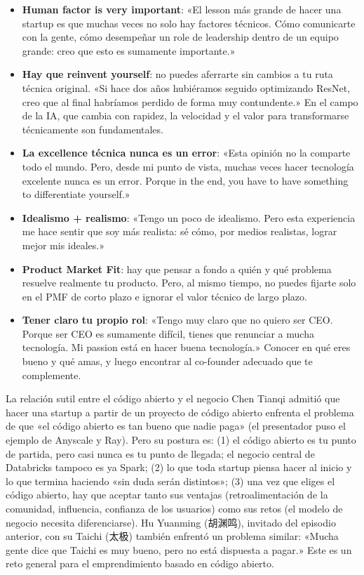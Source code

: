 \begin{itemize}
    \item \textbf{Human factor is very important}: «El lesson más grande de hacer una startup es que muchas veces no solo hay factores técnicos. Cómo comunicarte con la gente, cómo desempeñar un role de leadership dentro de un equipo grande: creo que esto es sumamente importante.»
    \item \textbf{Hay que reinvent yourself}: no puedes aferrarte sin cambios a tu ruta técnica original. «Si hace dos años hubiéramos seguido optimizando ResNet, creo que al final habríamos perdido de forma muy contundente.» En el campo de la IA, que cambia con rapidez, la velocidad y el valor para transformarse técnicamente son fundamentales.
    \item \textbf{La excellence técnica nunca es un error}: «Esta opinión no la comparte todo el mundo. Pero, desde mi punto de vista, muchas veces hacer tecnología excelente nunca es un error. Porque in the end, you have to have something to differentiate yourself.»
    \item \textbf{Idealismo + realismo}: «Tengo un poco de idealismo. Pero esta experiencia me hace sentir que soy más realista: sé cómo, por medios realistas, lograr mejor mis ideales.»
    \item \textbf{Product Market Fit}: hay que pensar a fondo a quién y qué problema resuelve realmente tu producto. Pero, al mismo tiempo, no puedes fijarte solo en el PMF de corto plazo e ignorar el valor técnico de largo plazo.
    \item \textbf{Tener claro tu propio rol}: «Tengo muy claro que no quiero ser CEO. Porque ser CEO es sumamente difícil, tienes que renunciar a mucha tecnología. Mi passion está en hacer buena tecnología.» Conocer en qué eres bueno y qué amas, y luego encontrar al co-founder adecuado que te complemente.
\end{itemize}

\begin{warningbox}{La relación sutil entre el código abierto y el negocio}
Chen Tianqi admitió que hacer una startup a partir de un proyecto de código abierto enfrenta el problema de que «el código abierto es tan bueno que nadie paga» (el presentador puso el ejemplo de Anyscale y Ray). Pero su postura es: (1) el código abierto es tu punto de partida, pero casi nunca es tu punto de llegada; el negocio central de Databricks tampoco es ya Spark; (2) lo que toda startup piensa hacer al inicio y lo que termina haciendo «sin duda serán distintos»; (3) una vez que eliges el código abierto, hay que aceptar tanto sus ventajas (retroalimentación de la comunidad, influencia, confianza de los usuarios) como sus retos (el modelo de negocio necesita diferenciarse). Hu Yuanming (胡渊鸣), invitado del episodio anterior, con su Taichi (太极) también enfrentó un problema similar: «Mucha gente dice que Taichi es muy bueno, pero no está dispuesta a pagar.» Este es un reto general para el emprendimiento basado en código abierto.
\end{warningbox}

